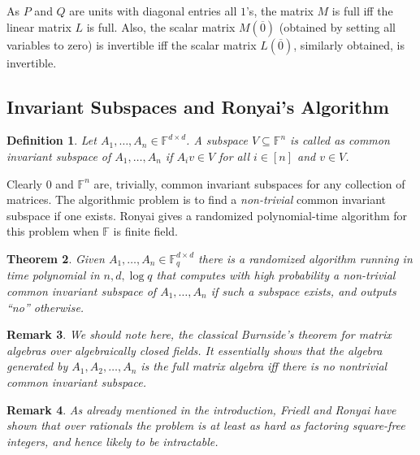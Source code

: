 \documentclass[10pt,a4paper]{article}
\newtheorem{theorem}{Theorem}[section]
\newtheorem{definition}[theorem]{Definition}
\newtheorem{remark}[theorem]{Remark}
\newcommand{\F}{\mathbb{F}}
\begin{document}
%
%
%
%
%

As $P$ and $Q$ are units with diagonal entries all $1$'s, the matrix
$M$ is full iff the linear matrix $L$ is full. Also, the scalar matrix
$M(\overline{0})$ (obtained by setting all variables to zero) is
invertible iff the scalar matrix $L(\overline{0})$, similarly
obtained, is invertible.\\

\subsection*{Invariant Subspaces and Ronyai's Algorithm}

\begin{definition}
Let $A_1, \ldots, A_n \in \mathbb{F}^{d \times d}$. A subspace
$V\subseteq \F^n$ is called as common invariant subspace of $A_1,
\ldots, A_n$ if $A_i v \in V$ for all $i\in [n]$ and $v\in V$. 
\end{definition}

Clearly $0$ and $\F^n$ are, trivially, common invariant subspaces for
any collection of matrices. The algorithmic problem is to find a
\emph{non-trivial} common invariant subspace if one exists. Ronyai
\cite{Ronyai2} gives a randomized polynomial-time algorithm for this problem
when $\F$ is finite field.

\begin{theorem}\label{thm-ronyai}{\rm\cite{Ronyai2}}
Given $A_1, \ldots, A_n \in \mathbb{F}_q^{d \times d}$ there is a
randomized algorithm running in time polynomial in $n,d, \log q$ that
computes with high probability a non-trivial common invariant subspace
of $A_1, \ldots, A_n$ if such a subspace exists, and outputs ``no''
otherwise.
\end{theorem}
  
\begin{remark}
 We should note here, the classical Burnside's theorem \cite{Bur05} for matrix algebras over algebraically closed fields. It essentially shows that the algebra generated by $A_1, A_2, \ldots, A_n$ is the full matrix algebra iff there is no nontrivial common invariant subspace. \end{remark}  
  
\begin{remark}
    As already mentioned in the introduction, Friedl and Ronyai
  \cite{FR85} have shown that over rationals the problem is at least as
  hard as factoring square-free integers, and hence likely to be
  intractable.
  
\end{remark}  
\end{document}
